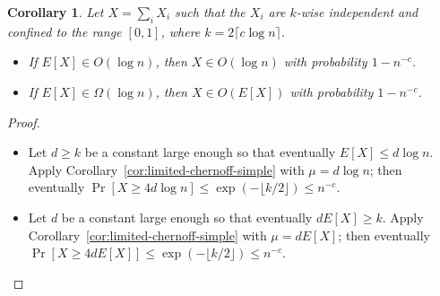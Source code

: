 \documentclass[11pt,a4paper]{article}
\newtheorem{corollary}[theorem]{Corollary}
\begin{document}
\begin{tcolorbox}
  \begin{corollary}
    Let \(X = \sum_i X_i\) such that the \(X_i\) are \(k\)-wise independent and confined to the range \([0, 1]\), where \(k = 2\lceil c\log n \rceil\).
    \begin{itemize}
    \item If \(E[X] \in O(\log n)\), then  \(X \in O(\log n)\) with probability \(1 - n^{-c}\).
    \item If \(E[X] \in \Omega(\log n)\), then \(X \in O(E[X])\) with probability \(1 - n^{-c}\).
    \end{itemize}
  \end{corollary}
\end{tcolorbox}
\begin{proof}\hfill
  \begin{itemize}
  \item
    Let \(d \ge k\) be a constant large enough so that eventually \(E[X] \le d \log n\).
    Apply Corollary~\ref{cor:limited-chernoff-simple} with \(\mu = d \log n\); 
    then eventually \(\Pr[X \ge 4d \log n] \le \exp(-\lfloor k/2 \rfloor) \le n^{-c}\).
  \item
    Let \(d\) be a constant large enough so that eventually \(d E[X] \ge k\).
    Apply Corollary~\ref{cor:limited-chernoff-simple} with \(\mu = dE[X]\);
    then eventually \(\Pr[X \ge 4dE[X]] \le \exp(-\lfloor k/2 \rfloor) \le n^{-c}\).
  \end{itemize}
\end{proof}

\end{document}
